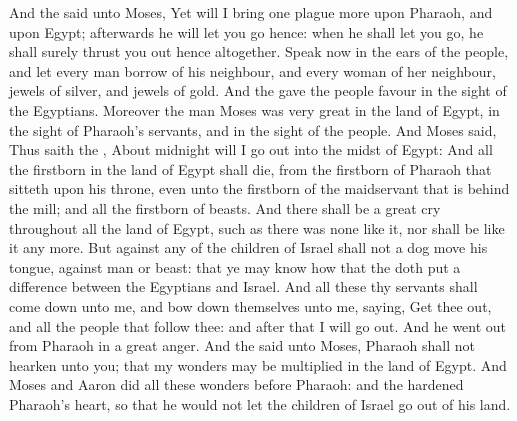 \begin{biblechapter} %
 And the \LORD said unto Moses, Yet will I bring one plague more upon Pharaoh, and upon Egypt; afterwards he will let you go hence: when he shall let you go, he shall surely thrust you out hence altogether.
\verse Speak now in the ears of the people, and let every man borrow of his neighbour, and every woman of her neighbour, jewels of silver, and jewels of gold.
\verse And the \LORD gave the people favour in the sight of the Egyptians. Moreover the man Moses was very great in the land of Egypt, in the sight of Pharaoh's servants, and in the sight of the people.
\verse And Moses said, Thus saith the \LORD, About midnight will I go out into the midst of Egypt:
\verse And all the firstborn in the land of Egypt shall die, from the firstborn of Pharaoh that sitteth upon his throne, even unto the firstborn of the maidservant that is behind the mill; and all the firstborn of beasts.
\verse And there shall be a great cry throughout all the land of Egypt, such as there was none like it, nor shall be like it any more.
\verse But against any of the children of Israel shall not a dog move his tongue, against man or beast: that ye may know how that the \LORD doth put a difference between the Egyptians and Israel.
\verse And all these thy servants shall come down unto me, and bow down themselves unto me, saying, Get thee out, and all the people that follow thee: and after that I will go out. And he went out from Pharaoh in a great anger.
\verse And the \LORD said unto Moses, Pharaoh shall not hearken unto you; that my wonders may be multiplied in the land of Egypt.
\verse And Moses and Aaron did all these wonders before Pharaoh: and the \LORD hardened Pharaoh's heart, so that he would not let the children of Israel go out of his land.
\end{biblechapter}

